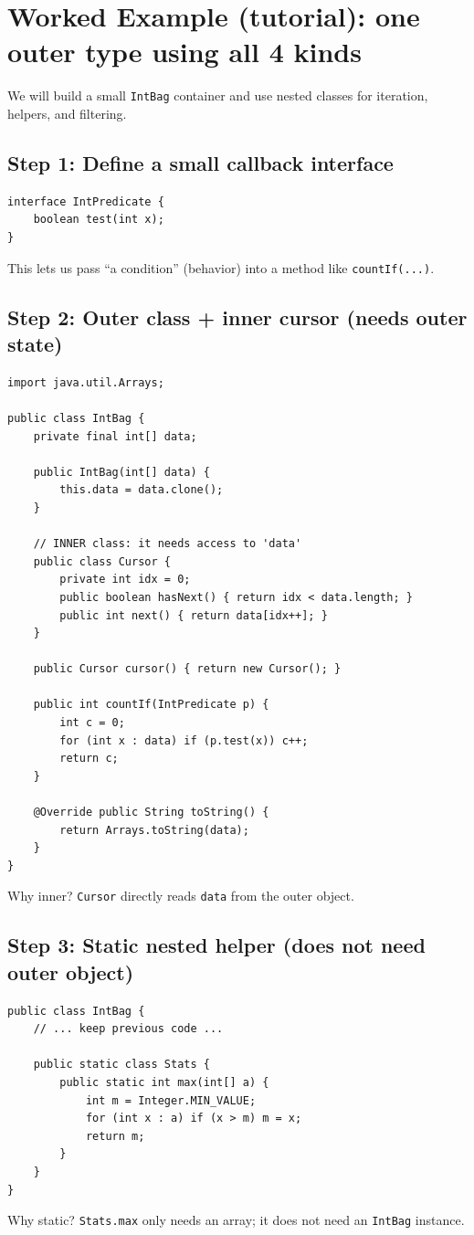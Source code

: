 \documentclass[11pt]{article}
\begin{document}
\section{Worked Example (tutorial): one outer type using all 4 kinds}
We will build a small \texttt{IntBag} container and use nested classes for iteration, helpers, and filtering.

\subsection*{Step 1: Define a small callback interface}
\begin{lstlisting}
interface IntPredicate {
    boolean test(int x);
}
\end{lstlisting}
This lets us pass ``a condition'' (behavior) into a method like \texttt{countIf(...)}.

\subsection*{Step 2: Outer class + inner cursor (needs outer state)}
\begin{lstlisting}
import java.util.Arrays;

public class IntBag {
    private final int[] data;

    public IntBag(int[] data) {
        this.data = data.clone();
    }

    // INNER class: it needs access to 'data'
    public class Cursor {
        private int idx = 0;
        public boolean hasNext() { return idx < data.length; }
        public int next() { return data[idx++]; }
    }

    public Cursor cursor() { return new Cursor(); }

    public int countIf(IntPredicate p) {
        int c = 0;
        for (int x : data) if (p.test(x)) c++;
        return c;
    }

    @Override public String toString() {
        return Arrays.toString(data);
    }
}
\end{lstlisting}
Why inner? \texttt{Cursor} directly reads \texttt{data} from the outer object.

\subsection*{Step 3: Static nested helper (does not need outer object)}
\begin{lstlisting}
public class IntBag {
    // ... keep previous code ...

    public static class Stats {
        public static int max(int[] a) {
            int m = Integer.MIN_VALUE;
            for (int x : a) if (x > m) m = x;
            return m;
        }
    }
}
\end{lstlisting}
Why static? \texttt{Stats.max} only needs an array; it does not need an \texttt{IntBag} instance.
\end{document}
